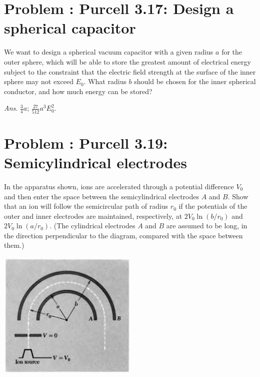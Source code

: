 \documentclass[problems]{esg8022pset}
\begin{document}
\section{Problem \thesection: Purcell 3.17: Design a spherical capacitor}
  We want to design a spherical vacuum capacitor with a given
  radius $a$ for the outer sphere, which will be able to store the greatest
  amount of electrical energy subject to the constraint that the electric
  field strength at the surface of the inner sphere may not exceed $E_0$.
  What radius $b$ should be chosen for the inner spherical conductor, and
  how much energy can be stored?

  \begin{flushright}\emph{Ans}. $\frac34 a$; $\frac{27}{512} a^3 E_0^2$.\end{flushright}
\section{Problem \thesection: Purcell 3.19: Semicylindrical electrodes}
  In the apparatus shown, ions are accelerated through a potential difference $V_0$ and then enter the space between the semicylindrical electrodes $A$ and $B$. Show that an ion will follow the semicircular path of radius $r_0$ if the potentials of the outer and inner electrodes are maintained, respectively, at $2V_0\ln(b/r_0)$ and $2V_0\ln(a/r_0)$. (The cylindrical electrodes $A$ and $B$ are assumed to be long, in the direction perpendicular to the diagram, compared with the space between them.)
  \begin{center}\includegraphics[width=0.5\textwidth]{ps04_06}\end{center}
\end{document}
